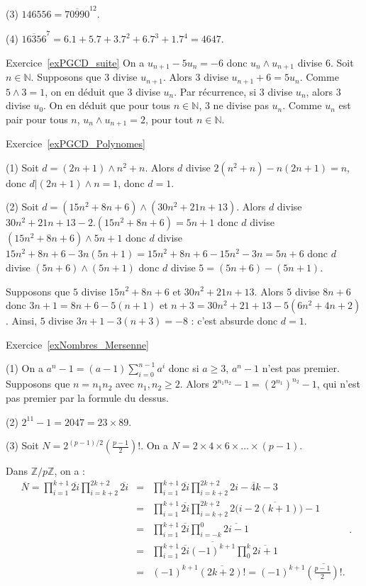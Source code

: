 \documentclass[11pt,a4paper]{article}
\newcommand{\N}{\mathbb{N}}
\newcommand{\Z}{\mathbb{Z}}
\begin{document}
(3) $146556=\overline{70990}^{12}$.

(4) $\overline{16356}^7=6.1+5.7+3.7^2+6.7^3+1.7^4=4647$.


Exercice~\ref{exPGCD_suite} On a $u_{n+1}-5u_n=-6$ donc $u_n\wedge u_{n+1}$ divise $6$. Soit $n\in \N$. Supposons que $3$ divise $u_{n+1}$. Alors $3$ divise $u_{n+1}+6=5 u_n$. Comme $5\wedge 3=1$, on en déduit que $3$ divise $u_n$. Par récurrence, si $3$ divise $u_n$, alors $3$ divise $u_0$. On en déduit que pour tous $n\in \N$, $3$ ne divise pas $u_n$. Comme $u_n$ est pair pour tous $n$, $u_n\wedge u_{n+1}=2$, pour tout $n\in \N$.

Exercice~\ref{exPGCD_Polynomes}

(1) Soit $d=(2n+1)\wedge n^2+n$. Alors $d$ divise $2(n^2+n)-n(2n+1)=n$, donc $d | (2n+1)\wedge n=1$, donc $d=1$.

(2) Soit $d=(15n^2+8n+6)\wedge (30 n^2+21n+13)$. Alors $d$ divise  $30 n^2+21n+13-2.(15 n^2+8n+6)=5n+1$ donc $d$ divise $(15 n^2+8n+6)\wedge 5n+1$ donc $d$ divise $15 n^2+8n+6-3n(5n+1)=15 n^2+8n+6-15n^2-3n=5n+6$ donc $d$ divise $(5n+6)\wedge(5n+1)$ donc $d$ divise $5=(5n+6)-(5n+1)$.

Supposons que $5$ divise $15n^2+8n+6$ et $30 n^2+21n+13$. Alors $5$ divise $8n+6$ donc $3n+1=8n+6-5(n+1)$ et  $n+3=30n^2+21+13-5(6n^2+4n+2)$. Ainsi, $5$ divise $3n+1-3(n+3)=-8$ : c'est absurde donc $d=1$. 

Exercice~\ref{exNombres_Mersenne}

(1) On a $a^n-1=(a-1)\sum_{i=0}^{n-1} a^i$ donc si $a\geq 3$, $a^n-1$ n'est pas premier. Supposons que $n=n_1n_2$ avec $n_1,n_2\geq 2$. Alors $2^{n_1n_2}-1=(2^{n_1})^{n_2}-1$, qui n'est pas premier par la formule du dessus.

(2) $2^{11}-1=2047=23\times 89$.

(3) Soit $N=2^{(p-1)/2} (\frac{p-1}{2})!$. On a $N=2\times 4\times 6\times \ldots \times (p-1)$. 

Dans $\Z/p\Z$, on a :\[\begin{aligned} \overline{N}=\prod_{i=1}^{k+1} \overline{2i}\prod_{i=k+2}^{2k+2} \overline{2i} &=&  \prod_{i=1}^{k+1} \overline{2i} \prod_{i=k+2}^{2k+2} \overline{2i-4k-3}\\
&=& \prod_{i=1}^{k+1} \overline{2i} \prod_{i=k+2}^{2k+2} \overline{2\big(i-2(k+1)\big)-1}\\
&=& \prod_{i=1}^{k+1} \overline{2i} \prod_{i=-k}^{0} \overline{2i-1}\\
&=& \prod_{i=1}^{k+1} \overline{2i}\overline{(-1)^{k+1}} \prod_{0}^{k} \overline{2i+1}\\
&=& (-1)^{k+1} \overline{(2k+2)!}=(-1)^{k+1}\overline{(\frac{p-1}{2})!}.\end{aligned}.\]
\end{document}
